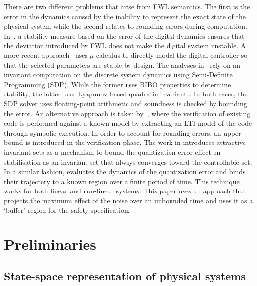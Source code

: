 \documentclass[runningheads,a4paper]{llncs}
\newcommand{\addtodo}[1]{{\color{red} TODO: #1}}
\begin{document}
There are two different problems that arise from FWL semantics.  The first
is the error in the dynamics caused by the inability to represent the exact
state of the physical system while the second relates to rounding errors
during computation.  In~\cite{fialho1994stability}, a stability measure
based on the error of the digital dynamics ensures that the deviation
introduced by FWL does not make the digital system unstable.  A more recent
approach~\cite{DBLP:journals/automatica/WuLCC09} uses $\mu$ calculus to
directly model the digital controller so that the selected parameters are
stable by design.  The analyses
in~\cite{DBLP:conf/hybrid/RouxJG15,DBLP:conf/hybrid/WangGRJF16} rely on an
invariant computation on the discrete system dynamics using Semi-Definite
Programming (SDP).  While the former uses BIBO properties to determine
stability, the latter uses Lyapunov-based quadratic invariants.  In both
cases, the SDP solver uses floating-point arithmetic and soundness is
checked by bounding the error.  An alternative approach is taken
by~\cite{park2016scalable}, where the verification of existing code is
performed against a known model by extracting an LTI model of the code
through symbolic execution.  In order to account for rounding errors, an
upper bound is introduced in the verification phase.
The work in \cite{picasso2003stabilization,picasso2002construction} introduces
attractive invariant sets as a mechanism to bound the quantization error effect
on stabilisation as an invariant set that always converges toward the controllable
set. In a similar fashion, \cite{liberzon2003hybrid} evaluates the dynamics of the
quantization error and binds their trajectory to a known region over a finite
period of time. This technique works for both linear and non-linear systems.
This paper uses an approach that projects the maximum effect of the noise over
an unbounded time and uses it as a `buffer' region for the safety specification.


\section{Preliminaries}
\label{sec:preliminaries}

\subsection{State-space representation of physical systems} 
\label{ssec:ssrepresentation}
\end{document}
